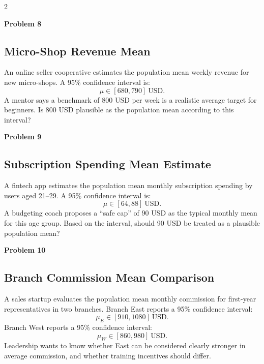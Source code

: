 \documentclass[12pt]{article}
\newcommand{\SubsectionBox}[1]{%
	\noindent\colorbox{gray!30}{\parbox{\linewidth}{\textbf{#1}}}\par\vspace{0.35cm}%
}
\begin{document}
\begin{multicols}{2}
		\vspace{0.5cm}
		\SubsectionBox{Problem 8}
		\subsection*{Micro-Shop Revenue Mean}
		An online seller cooperative estimates the population mean weekly revenue for new micro-shops.
		A 95\% confidence interval is:
		\[
		\mu \in [680, 790]\ \text{USD}.
		\]
		A mentor says a benchmark of 800 USD per week is a realistic average target for beginners.
		Is 800 USD plausible as the population mean according to this interval?
		
		\vspace{0.5cm}
		\SubsectionBox{Problem 9}
		\subsection*{Subscription Spending Mean Estimate}
		A fintech app estimates the population mean monthly subscription spending by users aged 21--29.
		A 95\% confidence interval is:
		\[
		\mu \in [64, 88]\ \text{USD}.
		\]
		A budgeting coach proposes a ``safe cap'' of 90 USD as the typical monthly mean for this age group.
		Based on the interval, should 90 USD be treated as a plausible population mean?
		
		\vspace{0.5cm}
		\SubsectionBox{Problem 10}
		\subsection*{Branch Commission Mean Comparison}
		A sales startup evaluates the population mean monthly commission for first-year representatives in two branches.
		Branch East reports a 95\% confidence interval:
		\[
		\mu_E \in [910, 1080]\ \text{USD}.
		\]
		Branch West reports a 95\% confidence interval:
		\[
		\mu_W \in [860, 980]\ \text{USD}.
		\]
		Leadership wants to know whether East can be considered clearly stronger in average commission, and whether training incentives should differ.
		
	\end{multicols}
	
\end{document}
